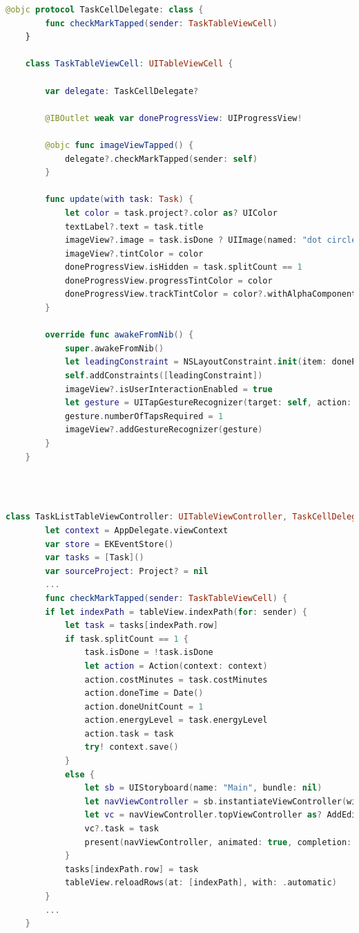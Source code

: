 \begin{lstlisting}[language={Swift}, caption={TaskTableViewCell}]
	@objc protocol TaskCellDelegate: class {
		func checkMarkTapped(sender: TaskTableViewCell)
	}

	class TaskTableViewCell: UITableViewCell {
		
		var delegate: TaskCellDelegate?
		
		@IBOutlet weak var doneProgressView: UIProgressView!
		
		@objc func imageViewTapped() {
			delegate?.checkMarkTapped(sender: self)
		}
		
		func update(with task: Task) {
			let color = task.project?.color as? UIColor
			textLabel?.text = task.title
			imageView?.image = task.isDone ? UIImage(named: "dot circle") : UIImage(named: "circle")
			imageView?.tintColor = color
			doneProgressView.isHidden = task.splitCount == 1
			doneProgressView.progressTintColor = color
			doneProgressView.trackTintColor = color?.withAlphaComponent(0.1)
		}
		
		override func awakeFromNib() {
			super.awakeFromNib()
			let leadingConstraint = NSLayoutConstraint.init(item: doneProgressView!, attribute: .leading, relatedBy: .equal, toItem: textLabel, attribute: .leading, multiplier: 1.0, constant: 0)
			self.addConstraints([leadingConstraint])
			imageView?.isUserInteractionEnabled = true
			let gesture = UITapGestureRecognizer(target: self, action: #selector(imageViewTapped))
			gesture.numberOfTapsRequired = 1
			imageView?.addGestureRecognizer(gesture)
		}
	}
\end{lstlisting}

~\\
~\\
\begin{lstlisting}[language={Swift}, caption={TaskListTableViewController实现代理的相关代码}]
	class TaskListTableViewController: UITableViewController, TaskCellDelegate {
		let context = AppDelegate.viewContext
		var store = EKEventStore()
		var tasks = [Task]()
		var sourceProject: Project? = nil
		...
		func checkMarkTapped(sender: TaskTableViewCell) {
        if let indexPath = tableView.indexPath(for: sender) {
            let task = tasks[indexPath.row]
            if task.splitCount == 1 {
                task.isDone = !task.isDone
                let action = Action(context: context)
                action.costMinutes = task.costMinutes
                action.doneTime = Date()
                action.doneUnitCount = 1
                action.energyLevel = task.energyLevel
                action.task = task
                try! context.save()
            }
            else {
                let sb = UIStoryboard(name: "Main", bundle: nil)
                let navViewController = sb.instantiateViewController(withIdentifier: "navAEAction") as! UINavigationController
                let vc = navViewController.topViewController as? AddEditActionTableViewController
                vc?.task = task
                present(navViewController, animated: true, completion: nil)
            }
            tasks[indexPath.row] = task
            tableView.reloadRows(at: [indexPath], with: .automatic)
		}
		...
    }
\end{lstlisting}

